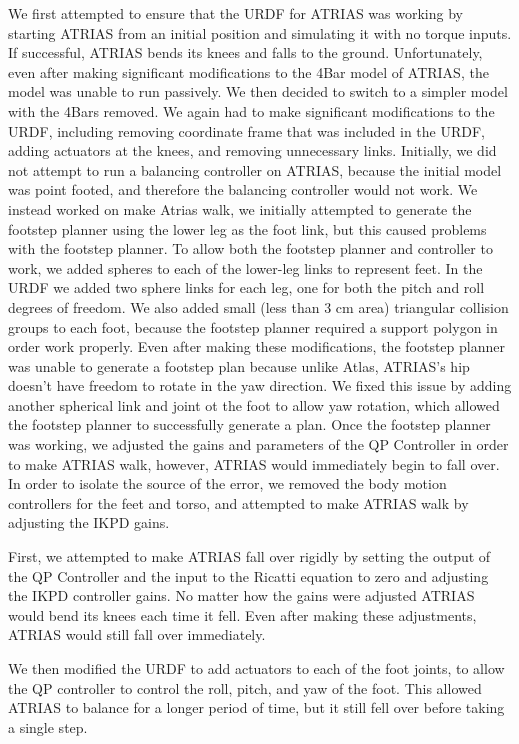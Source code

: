 \documentclass[letterpaper, 10 pt, conference]{ieeeconf}  %
\begin{document}
We first attempted to ensure that the URDF for ATRIAS was working by starting ATRIAS from an initial position and simulating it with no torque inputs. If successful, ATRIAS bends its knees and falls to the ground. Unfortunately, even after making significant modifications to the 4Bar model of ATRIAS, the model was unable to run passively. We then decided to switch to a simpler model with the 4Bars removed. We again had to make significant modifications to the URDF, including removing coordinate frame that was included in the URDF, adding actuators at the knees, and removing unnecessary links. Initially, we did not attempt to run a balancing controller on ATRIAS, because the initial model was point footed, and therefore the balancing controller would not work. We instead worked on make Atrias walk, we initially attempted to generate the footstep planner using the lower leg as the foot link, but this caused problems with the footstep planner. To allow both the footstep planner and controller to work, we added spheres to each of the lower-leg links to represent feet. In the URDF we added two sphere links for each leg, one for both the pitch and roll degrees of freedom. We also added small (less than 3 cm area) triangular collision groups to each foot, because the footstep planner required a support polygon in order work properly. Even after making these modifications, the footstep planner was unable to generate a footstep plan because unlike Atlas, ATRIAS’s hip doesn’t have freedom to rotate in the yaw direction. We fixed this issue by adding another spherical link and joint ot the foot to allow yaw rotation, which allowed the footstep planner to successfully generate a plan. 
Once the footstep planner was working, we adjusted the gains and parameters of the QP Controller in order to make ATRIAS walk, however, ATRIAS would immediately begin to fall over. In order to isolate the source of the error, we removed the body motion controllers for the feet and torso, and attempted to make ATRIAS walk by adjusting the IKPD gains.

First, we attempted to make ATRIAS  fall over rigidly by setting the output of the QP Controller and the input to the Ricatti equation to zero and adjusting the IKPD controller gains. No matter how the gains were adjusted ATRIAS would bend its knees each time it fell. Even after making these adjustments, ATRIAS would still fall over immediately.

We then modified the URDF to add actuators to each of the foot joints, to allow the QP controller to control the roll, pitch, and yaw of the foot. This allowed ATRIAS to balance for a longer period of time, but it still fell over before taking a single step. 
\end{document}

